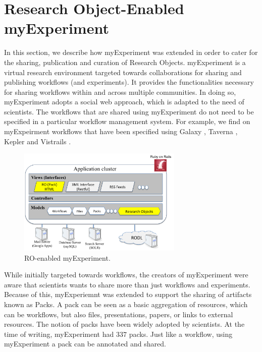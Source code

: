 \section{Research Object-Enabled myExperiment}
\label{sec:myexperiment}


In this section, we describe how myExperiment \cite{DBLP:journals/fgcs/RoureGS09} was extended in order to cater for the sharing, publication and curation of Research Objects. myExperiment is a virtual research environment targeted towards collaborations for sharing and publishing workflows (and experiments). It provides the functionalities necessary for sharing workflows within and across multiple communities. In doing so, myExperiment adopts a social web approach, which is adapted to the need of scientists. The workflows that are shared using myExperiment do not need to be specified in a particular workflow management system. For example, we find on myExpeirment workflows that have been specified using Galaxy \cite{galaxy}, Taverna \cite{taverna}, Kepler \cite{kepler} and Vistrails \cite{vistrails}.

\begin{figure}
\begin{center}
\includegraphics[width=0.7\textwidth]{Figures/myexperimentArchitecture.png}
\end{center}
\caption{RO-enabled myExperiment.}
\label{fig:myexperimentarchitecture}
\end{figure}


While initially targeted towards workflows, the creators of myExperiment were aware that scientists wants to share more than just workflows and experiments. Because of this, myExperiemnt was extended to support the sharing of artifacts known as Packs. A pack can be seen as a basic aggregation of resources, which can be workflows, but also files, presentations, papers, or links to external resources. 
The notion of packs have been widely adopted by scientists. At the time of writing, myExperiment had $337$ packs. Just like a workflow, using myExperiment a pack can be annotated and shared. 
 
